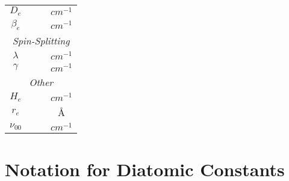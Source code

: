 \documentclass[11pt, twoside, fleqn]{report}
\begin{document}
\begin{table}[H]
\begin{tabular}{cccc}
        \cmidrule(lr){1-4}
        $D_{e}$           &                              &                              & $\unit{cm^{-1}}$ \\
        $\beta_{e}$       &                              &                              & $\unit{cm^{-1}}$ \\
        \multicolumn{4}{c}{\textit{Spin-Splitting}}                                                        \\
        \cmidrule(lr){1-4}
        $\lambda$         &                              &                              & $\unit{cm^{-1}}$ \\
        $\gamma$          &                              &                              & $\unit{cm^{-1}}$ \\
        \multicolumn{4}{c}{\textit{Other}}                                                                 \\
        \cmidrule(lr){1-4}
        $H_{e}$           &                              &                              & $\unit{cm^{-1}}$ \\
        $r_{e}$           &                              &                              & \AA              \\
        $\nu_{00}$        &                              &                              & $\unit{cm^{-1}}$ \\
        \bottomrule
    \end{tabular}
\end{table}

\chapter{Notation for Diatomic Constants}
\label{a:notation_for_diatomic_constants}
\end{document}
